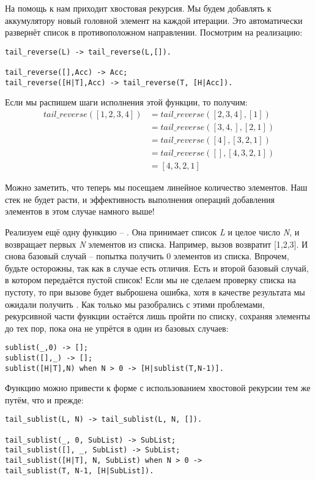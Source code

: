 На помощь к нам приходит хвостовая рекурсия.
Мы будем добавлять к аккумулятору новый головной элемент на каждой итерации.
Это автоматически развернёт список в противоположном направлении.
Посмотрим на реализацию:
\begin{lstlisting}[style=erlang]
tail_reverse(L) -> tail_reverse(L,[]).
 
tail_reverse([],Acc) -> Acc;
tail_reverse([H|T],Acc) -> tail_reverse(T, [H|Acc]).
\end{lstlisting}

Если мы распишем шаги исполнения этой функции, то получим:
\begin{align*}
tail\_reverse([1,2,3,4]) &= tail\_reverse([2,3,4], [1])\\
&= tail\_reverse([3,4,], [2,1])\\
&= tail\_reverse([4], [3,2,1])\\
&= tail\_reverse([], [4,3,2,1])\\
&= [4,3,2,1]
\end{align*}

Можно заметить, что теперь мы посещаем линейное количество элементов.
Наш стек не будет расти, и эффективность выполнения операций добавления элементов в этом случае намного выше!

Реализуем ещё одну функцию \--- . Она принимает список \emph{L} и целое число \emph{N}, и возвращает первых \emph{N} элементов из списка.
Например, вызов  возвратит [1,2,3].
И снова базовый случай \--- попытка получить 0 элементов из списка.
Впрочем, будьте осторожны, так как в случае  есть отличия.
Есть и второй базовый случай, в котором передаётся пустой список!
Если мы не сделаем проверку списка на пустоту, то при вызове  будет выброшена ошибка, хотя в качестве результата мы ожидали получить \ops{[1]}.
Как только мы разобрались с этими проблемами, рекурсивной части функции остаётся лишь пройти по списку, сохраняя элементы до тех пор, пока она не упрётся в один из базовых случаев:
\begin{lstlisting}[style=erlang]
sublist(_,0) -> [];
sublist([],_) -> [];
sublist([H|T],N) when N > 0 -> [H|sublist(T,N-1)].
\end{lstlisting}

Функцию можно привести к форме с использованием хвостовой рекурсии тем же путём, что и прежде:
\begin{lstlisting}[style=erlang]
tail_sublist(L, N) -> tail_sublist(L, N, []).
 
tail_sublist(_, 0, SubList) -> SubList;
tail_sublist([], _, SubList) -> SubList;
tail_sublist([H|T], N, SubList) when N > 0 ->
tail_sublist(T, N-1, [H|SubList]).
\end{lstlisting}

